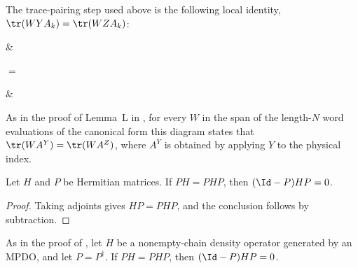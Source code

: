 The trace-pairing step used above is the following local identity,
$\tr(WYA_k)=\tr(WZA_k)$:
\begin{center}
    \tenkzkernel
    \begin{tenkz}[cols=2, boundary=periodic]
         & 
    \end{tenkz}
    $ = $
    \begin{tenkz}[cols=2, boundary=periodic]
         & 
    \end{tenkz}
\end{center}
As in the proof of Lemma~L in
\cite[Appendix~C.3, lines~1848--1858]{Cirac2016MPDO_arXiv}, for every $W$ in
the span of the length-$N$ word evaluations of the canonical form this diagram
states that $\tr(WA^Y)=\tr(WA^Z)$, where $A^Y$ is obtained by applying $Y$ to
the physical index.

\begin{lemma}
    \label{thm:hermitian_opposite_corner_zero}
    \leanok
    Let $H$ and $P$ be Hermitian matrices. If $PH=PHP$, then
    $(\Id-P)HP=0$.
\end{lemma}

\begin{proof}\leanok
    Taking adjoints gives $HP=PHP$, and the conclusion follows by
    subtraction.
\end{proof}

\begin{lemma}
    \label{thm:mpdo_opposite_corner_zero}
    \leanok
    As in the proof of \cite[Proposition~4.13]{Cirac2016MPDO_arXiv}, let $H$
    be a nonempty-chain density operator generated by an MPDO, and let
    $P=P^\dagger$. If $PH=PHP$, then $(\Id-P)HP=0$.
\end{lemma}

